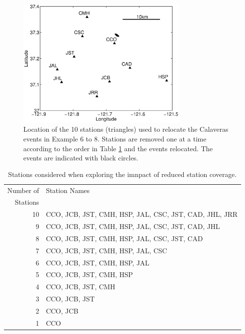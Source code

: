 \documentclass[extra, onecolumn, doublespacing]{gji}
\begin{document}
\begin{figure}
\noindent\includegraphics[width =
20pc]{diags/CalaverasMap/matlab/Calaveras_substationmap}
\caption{Location of the 10 stations (triangles) used to relocate
the Calaveras events in Example 6 to 8. Stations are removed one at
a time according to the order in Table
\ref{tab:Calaveras-stationremoval} and the events relocated. The
events are indicated with black circles.}
\label{fig:-eqopti-Calaveras-substations}
\end{figure}

\begin{table}
\caption{Stations considered when exploring the imnpact of reduced
station coverage.} \label{tab:Calaveras-stationremoval}
\begin{tabular}{|r|l|}
\hline
Number of & Station Names\\
Stations  & \\
\hline
10 & CCO, JCB, JST, CMH, HSP, JAL, CSC, JST, CAD, JHL, JRR\\
9  & CCO, JCB, JST, CMH, HSP, JAL, CSC, JST, CAD, JHL\\
8  & CCO, JCB, JST, CMH, HSP, JAL, CSC, JST, CAD\\
7  & CCO, JCB, JST, CMH, HSP, JAL, CSC \\
6  & CCO, JCB, JST, CMH, HSP, JAL \\
5  & CCO, JCB, JST, CMH, HSP \\
4  & CCO, JCB, JST, CMH \\
3  & CCO, JCB, JST \\
2  & CCO, JCB \\
1  & CCO \\
\hline
\end{tabular}
\end{table}
\end{document}
